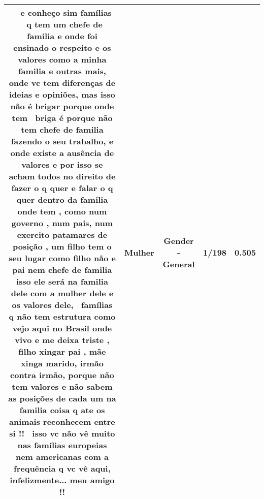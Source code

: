 \documentclass[11pt]{article}
\newlength\mylength
\begin{document}
\begin{center}
\begin{longtable}{|C{.65\mylength}|C{.30\mylength}|C{.12\mylength}|C{.12\mylength}|C{.12\mylength}|}
  \small {}  e conheço sim famílias  q tem um chefe de familia e onde foi ensinado o respeito e os valores como a minha familia e outras mais, onde vc tem diferenças de ideias e opiniões, mas isso não é brigar porque onde tem  briga é porque não tem chefe de familia fazendo o seu trabalho, e onde existe a ausência de valores e por isso se acham todos no direito de fazer o q quer e falar o q quer dentro da familia onde tem , como num governo , num pais, num exercito patamares de posição , um filho tem o seu lugar como filho não e pai nem chefe de familia isso ele será na familia dele com a \textbf{mulher} dele e os valores dele,  famílias q não tem estrutura como vejo aqui no Brasil onde vivo e me deixa triste , filho xingar pai , mãe xinga marido, irmão contra irmão, porque não tem valores e não sabem as posições de cada um na familia coisa q ate os animais reconhecem entre si !!  isso vc não vê muito nas famílias europeias nem americanas com a frequência q vc vê aqui, infelizmente... meu amigo !!\normalsize   & Mulher & Gender - General & 1/198 & 0.505 \\  \hline

\end{longtable}
\end{center}
\end{document}
